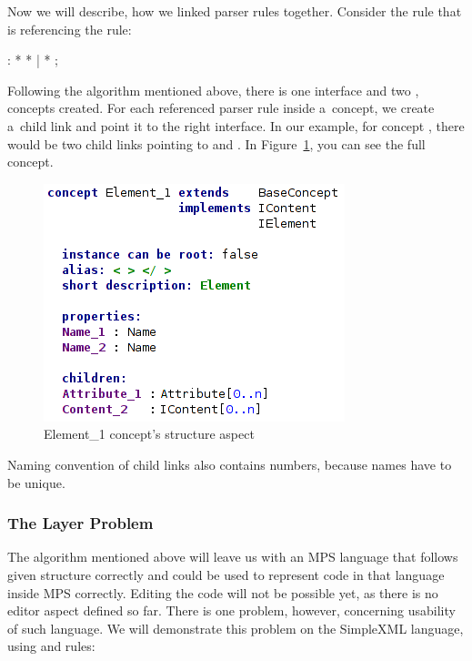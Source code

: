 Now we will describe, how we linked parser rules together.
Consider the  rule that is referencing the  rule:

\begin{antlr}
	    :   \literal{<}  * \literal{>} * \literal{</}  \literal{>}
           |   \literal{<}  * \literal{/>}
           ;
\end{antlr}

Following the algorithm mentioned above, there is one  interface and two ,  concepts created.
For each referenced parser rule inside a~concept, we create a~child link and point it to the right interface.
In our example, for concept , there would be two child links pointing to  and .
In Figure~\ref{fig:element_concept_full}, you can see the full  concept.

\begin{figure}[ht]
	\centering
	\includegraphics[scale=0.75]{./img/element_concept_full.png}
	\caption{Element{\_}1 concept's structure aspect}
	\label{fig:element_concept_full}
\end{figure}

Naming convention of child links also contains numbers, because names have to be unique.

\subsubsection{The Layer Problem}
\label{chap:layer_problem}

The algorithm mentioned above will leave us with an MPS language that follows given structure correctly and could be used to represent code in that language inside MPS correctly. Editing the code will not be possible yet, as there is no editor aspect defined so far.
There is one problem, however, concerning usability of such language.
We will demonstrate this problem on the SimpleXML language, using  and  rules:

